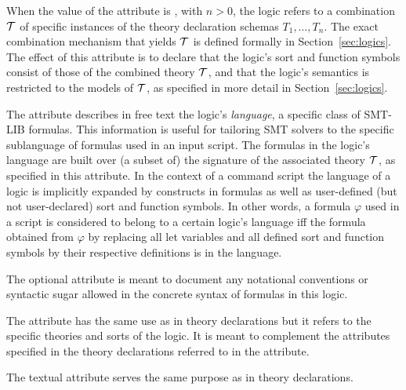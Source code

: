 When the value of the  attribute is ,
with $n > 0$,
the logic refers to a combination $\mathcal{T}$ of specific instances of 
the theory declaration schemas $T_1, \ldots, T_n$.
The exact combination mechanism that yields $\mathcal{T}$ is defined formally in 
Section~\ref{sec:logics}.
The effect of this attribute is to declare that 
the logic's sort and function symbols consist of those of 
the combined theory $\mathcal{T}$,
and that
the logic's semantics is restricted to the models of $\mathcal{T}$,
as specified in more detail in Section~\ref{sec:logics}.

The  attribute describes in free text the logic's
\emph{language}, a specific class of SMT-LIB formulas.
This information is useful for tailoring SMT solvers 
to the specific sublanguage of formulas used in an input script.
The formulas in the logic's language are built over (a subset of) 
the signature of the associated theory $\mathcal{T}$, as specified in this attribute.
In the context of a command script the language of a logic 
is implicitly expanded by  constructs in formulas as well as 
user-defined (but not user-declared) sort and function symbols.
In other words, a formula $\varphi$ used in a script is considered to belong 
to a certain logic's language
iff
the formula obtained from $\varphi$ by replacing all let variables and 
all defined sort and function symbols by their respective definitions
is in the language.

The optional  attribute is meant 
to document any notational conventions or syntactic sugar allowed in
the concrete syntax of formulas in this logic.

The  attribute has the same use as in theory declarations
but it refers to the specific theories and sorts of the logic.
It is meant to complement the  attributes specified in
the theory declarations referred to in the  attribute.

The textual  attribute serves the same purpose as in theory declarations. 


